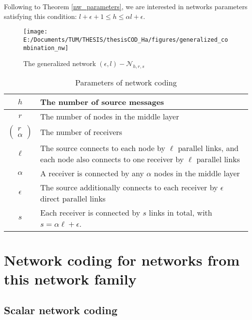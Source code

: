 \begin{rem}
Following to Theorem \ref{nw_parameters}, we are interested in networks
parameters satisfying this condition: $l+\epsilon+1\leq h\leq\alpha l+\epsilon$.
\end{rem}
\begin{figure}[H]
\caption{The generalized network $(\epsilon,l)-\mathcal{N}_{h,r,s}$\label{fig:The-generalized-network}}

\texttt{[image: E:/Documents/TUM/THESIS/thesisCOD\_Ha/figures/generalized\_combination\_nw]}
\end{figure}

\begin{table}[H]
\caption{Parameters of network coding \label{tab:Parameters-of-network}}

\begin{tabular}{c|>{\centering}p{0.48\paperwidth}}
$h$ & The number of source messages\tabularnewline
\hline 
$r$ & The number of nodes in the middle layer\tabularnewline
\hline 
$\left(\begin{array}{c}
r\\
\alpha
\end{array}\right)$ & The number of receivers\tabularnewline
\hline 
$\ell$ & The source connects to each node by $\ell$ parallel links, and each
node also connects to one receiver by $\ell$ parallel links\tabularnewline
\hline 
$\alpha$ & A receiver is connected by any $\alpha$ nodes in the middle layer\tabularnewline
\hline 
$\epsilon$ & The source additionally connects to each receiver by $\epsilon$ direct
parallel links\tabularnewline
\hline 
$s$ & Each receiver is connected by $s$ links in total, with $s=\alpha\ell+\epsilon$.\tabularnewline
\end{tabular}
\end{table}


\section{Network coding for networks from this network family}

\subsection{Scalar network coding}

